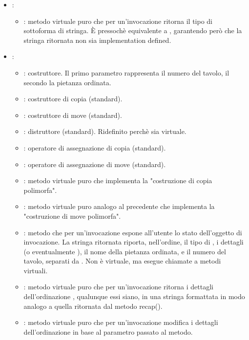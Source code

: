 \begin{itemize}
	\item {}:
	\begin{itemize}
		\item {}: metodo virtuale puro che per un'invocazione  ritorna il tipo di  sottoforma di stringa. È pressochè equivalente a , garantendo però che la stringa ritornata non sia implementation defined.
	\end{itemize}
	\item {}:
	\begin{itemize}
		\item {}: costruttore. Il primo parametro rappresenta il numero del tavolo, il secondo la pietanza ordinata.
		\item {}: costruttore di copia (standard).
		\item {}: costruttore di move (standard).
		\item {}: distruttore (standard). Ridefinito perchè sia virtuale.
		\item {}: operatore di assegnazione di copia (standard).
		\item {}: operatore di assegnazione di move (standard).
		\item {}: metodo virtuale puro che implementa la "costruzione di copia polimorfa".
		\item {}: metodo virtuale puro analogo al precedente che implementa la "costruzione di move polimorfa".
		\item {}: metodo che per un'invocazione  espone all'utente lo stato dell'oggetto di invocazione. La stringa ritornata riporta, nell'ordine, il tipo di , i dettagli (o eventualmente ), il nome della pietanza ordinata, e il numero del tavolo, separati da . Non è virtuale, ma esegue chiamate a metodi virtuali.
		\item {}: metodo virtuale puro che per un'invocazione  ritorna i dettagli dell'ordinazione , qualunque essi siano, in una stringa formattata in modo analogo a quella ritornata dal metodo recap().
		\item {}: metodo virtuale puro che per un'invocazione  modifica i dettagli dell'ordinazione  in base al parametro passato al metodo.

\end{itemize}
\end{itemize}
